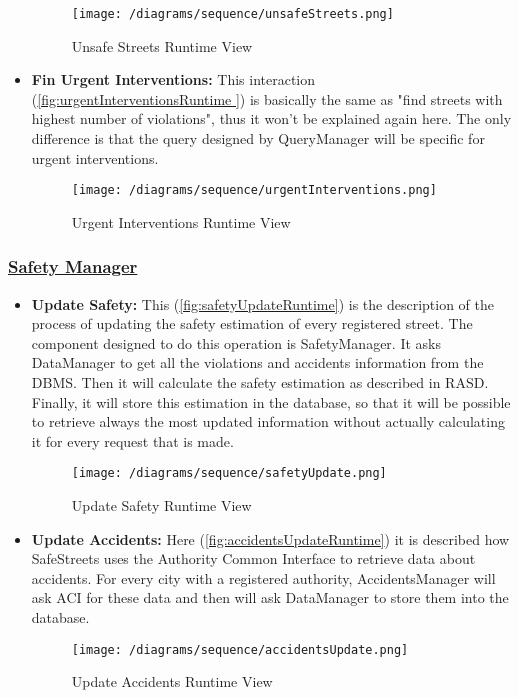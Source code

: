 \begin{itemize}
				\begin{figure}[h!]
					\centering
					\texttt{[image: /diagrams/sequence/unsafeStreets.png]}
					\caption{\label{fig:unsafeStreetsRuntime} Unsafe Streets Runtime View}
				\end{figure}
			
				\item \textbf{Fin Urgent Interventions:} This interaction (\autoref{fig:urgentInterventionsRuntime
				}) is basically the same as "find streets with highest number of violations", thus it won't be explained again here. The only difference is that the query designed by QueryManager will be specific for urgent interventions.
				
				\begin{figure}[h!]
					\centering
					\texttt{[image: /diagrams/sequence/urgentInterventions.png]}
					\caption{\label{fig:urgentInterventionsRuntime} Urgent Interventions Runtime View}
				\end{figure}
			\end{itemize}
		
		\subsubsection[Safety Manager]{\hyperlink{toc}{Safety Manager}}
			\label{sec.safetyManagerRuntime}
			
			\begin{itemize}
				\item \textbf{Update Safety:} This  (\autoref{fig:safetyUpdateRuntime}) is the description of the process of updating the safety estimation of every registered street. The component designed to do this operation is SafetyManager. It asks DataManager to get all the violations and accidents information from the DBMS. Then it will calculate the safety estimation as described in RASD. Finally, it will store this estimation in the database, so that it will be possible to retrieve always the most updated information without actually calculating it for every request that is made.
				
				\begin{figure}[h!]
					\centering
					\texttt{[image: /diagrams/sequence/safetyUpdate.png]}
					\caption{\label{fig:safetyUpdateRuntime} Update Safety Runtime View}
				\end{figure}
			
				\item \textbf{Update Accidents:} Here (\autoref{fig:accidentsUpdateRuntime}) it is described how SafeStreets uses the Authority Common Interface to retrieve data about accidents. For every city with a registered authority, AccidentsManager will ask ACI for these data and then will ask DataManager to store them into the database.
				
				\begin{figure}[h!]
					\centering
					\texttt{[image: /diagrams/sequence/accidentsUpdate.png]}
					\caption{\label{fig:accidentsUpdateRuntime} Update Accidents Runtime View}
				\end{figure}
			\end{itemize}
		
